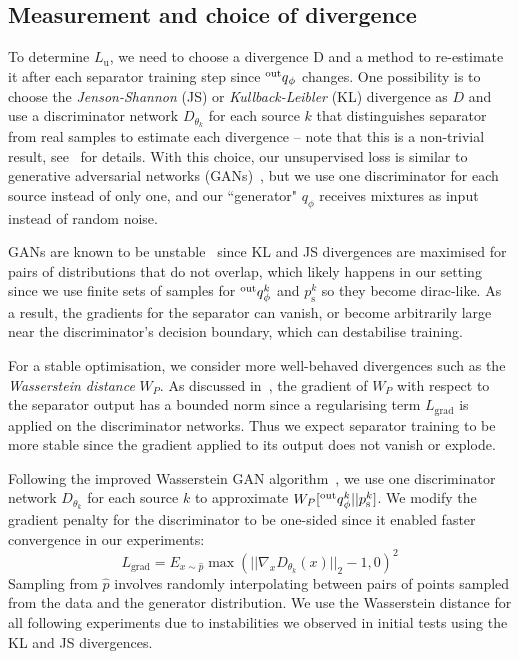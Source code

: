 \documentclass{article}
\begin{document}
\subsection{Measurement and choice of divergence}

To determine $L_{\text{u}}$, we need to choose a divergence D and a method to re-estimate it after each separator training step since $\prescript{\text{out}}{}{q}_{\phi}$ changes.
One possibility is to choose the \textit{Jenson-Shannon} (JS) or \textit{Kullback-Leibler} (KL) divergence as $D$ and use a discriminator network $D_{\theta_k}$ for each source $k$ that distinguishes separator from real samples to estimate each divergence -- note that this is a non-trivial result, see~\cite{Goodfellow2014} for details.
With this choice, our unsupervised loss is similar to generative adversarial networks (GANs)~\cite{Goodfellow2014}, but we use one discriminator for each source instead of only one, and our ``generator" $q_{\phi}$ receives mixtures as input instead of random noise.

GANs are known to be unstable~\cite{Arjovsky2017a} since KL and JS divergences are maximised for pairs of distributions that do not overlap, which likely happens in our setting since we use finite sets of samples for $\prescript{\text{out}}{}{q}^{k}_{\phi}$ and $p^k_{\text{s}}$ so they become dirac-like.
As a result, the gradients for the separator can vanish, or become arbitrarily large near the discriminator's decision boundary, which can destabilise training.

For a stable optimisation, we consider more well-behaved divergences such as the \textit{Wasserstein distance} $W_P$.
As discussed in~\cite{Gulrajani2017}, the gradient of $W_P$ with respect to the separator output has a bounded norm since a regularising term $L_{\text{grad}}$ is applied on the discriminator networks.
Thus we expect separator training to be more stable since the gradient applied to its output does not vanish or explode.

Following the improved Wasserstein GAN algorithm~\cite{Gulrajani2017}, we use one discriminator network $D_{\theta_k}$ for each source $k$ to approximate $W_P[\prescript{\text{out}}{}{q}^k_{\phi}||p^k_{\text{s}}]$.
We modify the gradient penalty for the discriminator to be one-sided since it enabled faster convergence in our experiments:
\begin{equation}
L_{\text{grad}} = E_{x \sim \hat{p}} \max(||\nabla_{x} D_{\theta_k}(x)||_2 - 1, 0)^2
\end{equation}
Sampling from $\hat{p}$ involves randomly interpolating between pairs of points sampled from the data and the generator distribution.
We use the Wasserstein distance for all following experiments due to instabilities we observed in initial tests using the KL and JS divergences.
\end{document}
